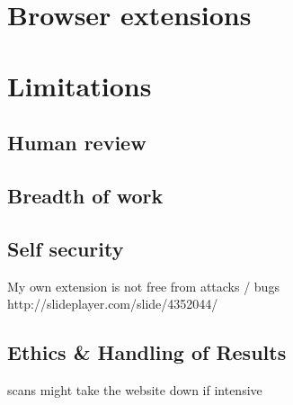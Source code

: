 \section{Browser extensions}
 
 
 
 
 

 
\section{Limitations}

\subsection{Human review}

 \subsection{Breadth of  work}
 
 \subsection{Self security}
 	 My own extension is not free from attacks / bugs
http://slideplayer.com/slide/4352044/

\subsection{Ethics \& Handling of Results}

scans might take the website down if intensive
 
